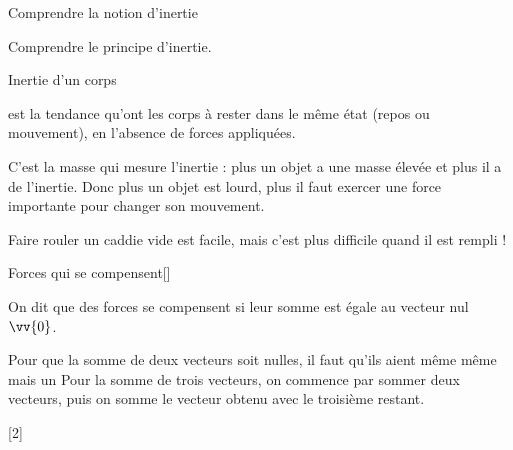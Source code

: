 \teteSndMouv

\vspace*{-36pt}

\vspace*{-16pt}
\begin{objectifs}
  \item Comprendre la notion d'inertie
  \item Comprendre le principe d'inertie.
\end{objectifs}


\begin{doc}{Inertie d'un corps}
  \begin{importants}
     est la tendance qu'ont les corps à rester dans le même état (repos ou mouvement), en l'absence de forces appliquées.
  \end{importants}
    
  C'est la masse qui mesure l'inertie : plus un objet a une masse élevée et plus il a de l'inertie.
  Donc plus un objet est lourd, plus il faut exercer une force importante pour changer son mouvement.
  
  \exemple Faire rouler un caddie vide est facile, mais c'est plus difficile quand il est rempli !
\end{doc}


\begin{doc}{Forces qui se compensent}[\label{doc:compensation_forces}]
  \begin{importants} 
    On dit que des forces se compensent si leur somme est égale au vecteur nul $\vv{0}$.
  \end{importants}
  Pour que la somme de deux vecteurs soit nulles, il faut qu'ils aient même  même  mais un 
  Pour la somme de trois vecteurs, on commence par sommer deux vecteurs, puis on somme le vecteur obtenu avec le troisième restant.
  
  \centering
\end{doc}

\newpage
{}[2]

